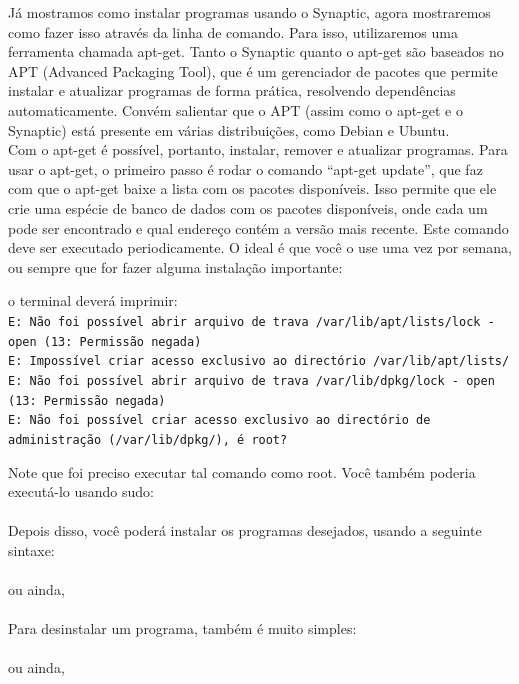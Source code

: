 \begin{refsection}
Já mostramos como instalar programas usando o Synaptic, agora mostraremos como fazer isso através da linha de comando. Para isso, utilizaremos uma ferramenta chamada apt-get. Tanto o Synaptic quanto o apt-get são baseados no APT (Advanced Packaging Tool), que é um gerenciador de pacotes que permite instalar e atualizar programas de forma prática, resolvendo dependências automaticamente. Convém salientar que o APT (assim como o apt-get e o Synaptic) está presente em várias distribuições, como Debian e Ubuntu.\\
Com o apt-get é possível, portanto, instalar, remover e atualizar programas. Para usar o apt-get, o primeiro passo é rodar o comando ``apt-get update'', que faz com que o apt-get baixe a lista com os pacotes disponíveis. Isso permite que ele crie uma espécie de banco de dados com os pacotes disponíveis, onde cada um pode ser encontrado e qual endereço contém a versão mais recente. Este comando deve ser executado periodicamente. O ideal é que você o use uma vez por semana, ou sempre que for fazer alguma instalação importante:\\


o terminal deverá imprimir:\\
\indent\indent\texttt{E: Não foi possível abrir arquivo de trava /var/lib/apt/lists/lock - open (13: Permissão negada)\\
E: Impossível criar acesso exclusivo ao directório /var/lib/apt/lists/\\
E: Não foi possível abrir arquivo de trava /var/lib/dpkg/lock - open (13: Permissão negada)\\
E: Não foi possível criar acesso exclusivo ao directório de administração (/var/lib/dpkg/), é root?\\}

Note que foi preciso executar tal comando como root. Você também poderia executá-lo usando sudo:\\
\\

Depois disso, você poderá instalar os programas desejados, usando a seguinte sintaxe:\\
\\
 ou ainda,\\
\\

Para desinstalar um programa, também é muito simples:\\
\\
 ou ainda,\\
\\


\end{refsection}
